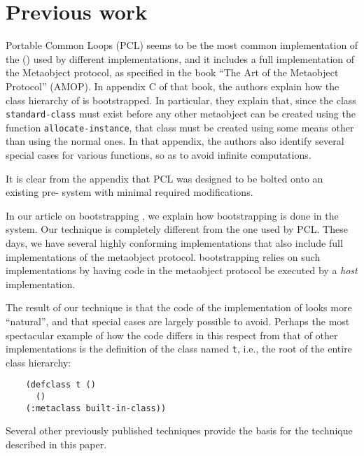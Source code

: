 \section{Previous work}

Portable Common Loops (PCL) seems to be the most common implementation
of the \closs{} (\clos{}) used by different \commonlisp{}
implementations, and it includes a full implementation of the \clos{}
Metaobject protocol, as specified in the book ``The Art of the
Metaobject Protocol'' \cite{Kiczales:1991:AMP:574212} (AMOP).  In
appendix C of that book, the authors explain how the class hierarchy
of \clos{} is bootstrapped.  In particular, they explain that, since
the class \texttt{standard-class} must exist before any other
metaobject can be created using the function
\texttt{allocate-instance}, that class must be created using some
means other than using the normal ones.  In that appendix, the authors
also identify several special cases for various functions, so as to
avoid infinite computations.

It is clear from the appendix that PCL was designed to be bolted onto
an existing pre-\clos{} \commonlisp{} system with minimal required
modifications.

In our article on bootstrapping
\cite{Durand-Strandh:2019:ELS:Bootstrapping}, we explain how
bootstrapping is done in the \sicl{} system.  Our technique is
completely different from the one used by PCL.  These days, we have
several highly conforming \commonlisp{} implementations that also
include full implementations of the metaobject protocol.  \sicl{}
bootstrapping relies on such implementations by having code in the
metaobject protocol be executed by a \emph{host} implementation.

The result of our technique is that the code of the \sicl{}
implementation of \clos{} looks more ``natural'', and that special
cases are largely possible to avoid.  Perhaps the most spectacular
example of how the \sicl{} \clos{} code differs in this respect from
that of other \commonlisp{} implementations is the definition of the
class named \texttt{t}, i.e., the root of the entire \clos{} class
hierarchy:

\begin{verbatim}
    (defclass t ()
      ()
    (:metaclass built-in-class))
\end{verbatim}

Several other previously published techniques provide the basis for
the technique described in this paper.

